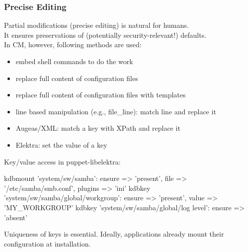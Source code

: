 \begin{frame}
	\frametitle{Precise Editing}

	Partial modifications (precise editing) is natural for humans. \\
	It ensures preservations of (potentially security-relevant!) defaults. \\
	In CM, however, following methods are used:

	\begin{itemize}[<+-| alert@+>] %
	\item embed shell commands to do the work
	\item replace full content of configuration files
	\item replace full content of configuration files with templates
	\item line based manipulation (e.g., file\_line): match line and replace it
	\item Augeas/XML: match a key with XPath and replace it
	\item Elektra: set the value of a key
	\end{itemize}
\end{frame}

\begin{frame}[fragile]
	Key/value access in puppet-libelektra:

	\begin{code}[morekeywords={kdbkey,kdbmount,ensure,value},gobble=4]
	kdbmount {'system/sw/samba':
		ensure => 'present',
		file => '/etc/samba/smb.conf',
		plugins => 'ini'
	}
	kdbkey {'system/sw/samba/global/workgroup':
		ensure => 'present',
		value => 'MY_WORKGROUP'
	}
	kdbkey {'system/sw/samba/global/log level':
		ensure => 'absent'
	}
	\end{code}

	Uniqueness of keys is essential.
	Ideally, applications already mount their configuration at installation.
\end{frame}


